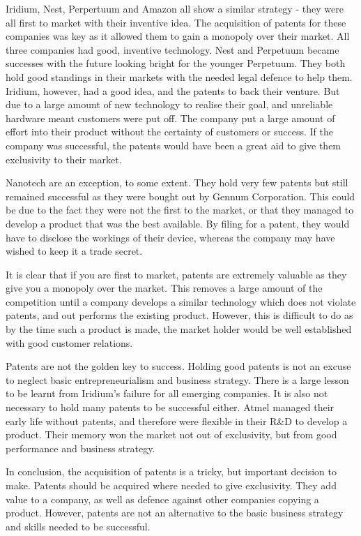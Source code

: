 Iridium, Nest, Perpertuum and Amazon all show a similar strategy - they were all first to market with their inventive idea.
The acquisition of patents for these companies was key as it allowed them to gain a monopoly over their market. 
All three companies had good, inventive technology.
Nest and Perpetuum became successes with the future looking bright for the younger Perpetuum. 
They both hold good standings in their markets with the needed legal defence to help them.
Iridium, however, had a good idea, and the patents to back their venture. 
But due to a large amount of new technology to realise their goal, and unreliable hardware meant customers were put off.
The company put a large amount of effort into their product without the certainty of customers or success. 
If the company was successful, the patents would have been a great aid to give them exclusivity to their market.

Nanotech are an exception, to some extent.
They hold very few patents \cite{nanotechpatent} but still remained successful as they were bought out by Gennum Corporation. 
This could be due to the fact they were not the first to the market, or that they managed to develop a product that was the best available. 
By filing for a patent, they would have to disclose the workings of their device, whereas the company may have wished to keep it a trade secret.

It is clear that if you are first to market, patents are extremely valuable as they give you a monopoly over the market. 
This removes a large amount of the competition until a company develops a similar technology which does not violate patents, and out performs the existing product. 
However, this is difficult to do as by the time such a product is made, the market holder would be well established with good customer relations.

Patents are not the golden key to success. 
Holding good patents is not an excuse to neglect basic entrepreneurialism and business strategy. 
There is a large lesson to be learnt from Iridium's failure for all emerging companies.
It is also not necessary to hold many patents to be successful either.
Atmel managed their early life without patents, and therefore were flexible in their R\&D to develop a product. 
Their memory won the market not out of exclusivity, but from good performance and business strategy.

In conclusion, the acquisition of patents is a tricky, but important decision to make.
Patents should be acquired where needed to give exclusivity.
They add value to a company, as well as defence against other companies copying a product.
However, patents are not an alternative to the basic business strategy and skills needed to be successful.



